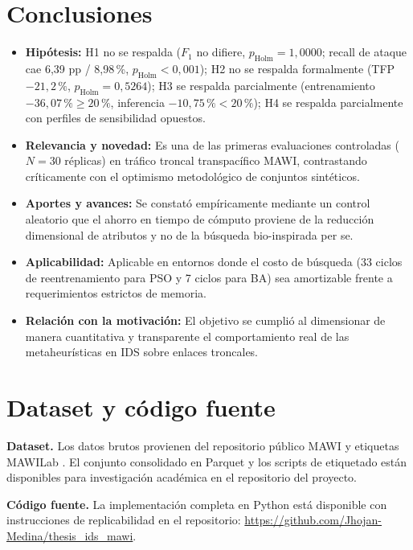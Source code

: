 \documentclass[11pt,a4paper]{article}
\begin{document}
\section{Conclusiones}
\begin{itemize}[leftmargin=1.5em,itemsep=2pt]
  \item \textbf{Hipótesis:} H1 no se respalda ($F_1$ no difiere, $p_{\text{Holm}} = 1{,}0000$; recall de ataque cae 6,39 pp / 8,98\,\%, $p_{\text{Holm}} < 0{,}001$); H2 no se respalda formalmente (TFP $-21{,}2\,\%$, $p_{\text{Holm}} = 0{,}5264$); H3 se respalda parcialmente (entrenamiento $-36{,}07\,\% \ge 20\,\%$, inferencia $-10{,}75\,\% < 20\,\%$); H4 se respalda parcialmente con perfiles de sensibilidad opuestos.
  \item \textbf{Relevancia y novedad:} Es una de las primeras evaluaciones controladas ($N = 30$ réplicas) en tráfico troncal transpacífico MAWI, contrastando críticamente con el optimismo metodológico de conjuntos sintéticos.
  \item \textbf{Aportes y avances:} Se constató empíricamente mediante un control aleatorio que el ahorro en tiempo de cómputo proviene de la reducción dimensional de atributos y no de la búsqueda bio-inspirada per se.
  \item \textbf{Aplicabilidad:} Aplicable en entornos donde el costo de búsqueda (33 ciclos de reentrenamiento para PSO y 7 ciclos para BA) sea amortizable frente a requerimientos estrictos de memoria.
  \item \textbf{Relación con la motivación:} El objetivo se cumplió al dimensionar de manera cuantitativa y transparente el comportamiento real de las metaheurísticas en IDS sobre enlaces troncales.
\end{itemize}

\section*{Dataset y código fuente}
\textbf{Dataset.} Los datos brutos provienen del repositorio público MAWI \parencite{mawiarchive} y etiquetas MAWILab \parencite{fontugne2010}. El conjunto consolidado en Parquet y los scripts de etiquetado están disponibles para investigación académica en el repositorio del proyecto.

\textbf{Código fuente.} La implementación completa en Python está disponible con instrucciones de replicabilidad en el repositorio: \url{https://github.com/Jhojan-Medina/thesis_ids_mawi}.

\printbibliography[title={Referencias}]
\end{document}
